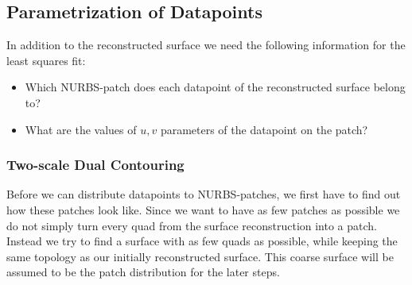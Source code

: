 \subsection{Parametrization of Datapoints}
\label{ssec:parametrization}
In addition to the reconstructed surface we need the following information for the least squares fit: 
\begin{itemize}
\item Which \ac{NURBS}-patch does each datapoint of the reconstructed surface belong to?
\item What are the values of $u,v$ parameters of the datapoint on the patch?
\end{itemize}
\subsubsection{Two-scale Dual Contouring}
Before we can distribute datapoints to \ac{NURBS}-patches, we first have to find out how these patches look like. Since we want to have as few patches as possible we do not simply turn every \ac{quad} from the surface reconstruction into a patch. Instead  we try to find a surface with as few \acp{quad} as possible, while keeping the same topology as our initially reconstructed surface. This coarse surface will be assumed to be the patch distribution for the later steps.



